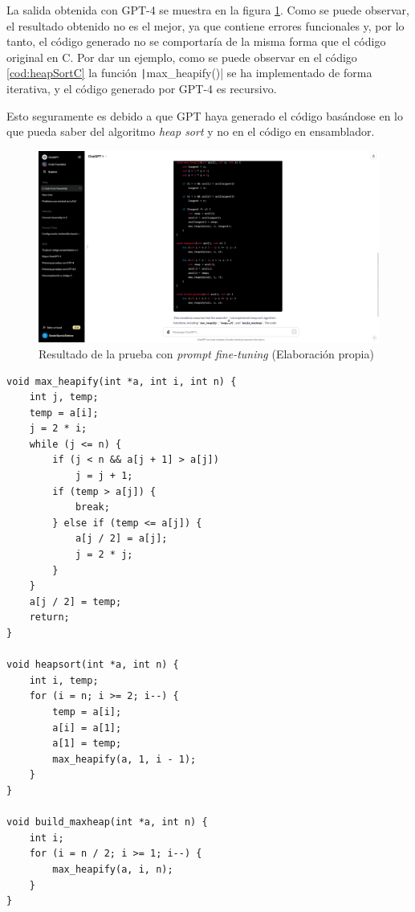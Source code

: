 La salida obtenida con GPT-4 se muestra en la figura \ref{fig:resultado_gpt4_prompt}. Como se puede
observar, el resultado obtenido no es el mejor, ya que contiene errores funcionales y, por lo tanto,
el código generado no se comportaría de la misma forma que el código original en C. Por dar un ejemplo,
como se puede observar en el código \ref{cod:heapSortC} la función \texttt|max_heapify()| se ha
implementado de forma iterativa, y el código generado por GPT-4 es recursivo.

Esto seguramente es debido a que GPT haya generado el código basándose en lo que pueda saber del algoritmo
\textit{heap sort} y no en el código en ensamblador.

\begin{figure}[H]
    \begin{center}
      \includegraphics[scale=0.3]{figuras/Capitulo_05/ResultadoPromptGPT4.png}
    \end{center}
    \caption[Resultado de la prueba con \textit{prompt fine-tuning}]{Resultado de la prueba con \textit{prompt fine-tuning} (Elaboración propia)}
    \label{fig:resultado_gpt4_prompt}
\end{figure}

\begin{mycode}
    \begin{verbatim}
void max_heapify(int *a, int i, int n) {
    int j, temp;
    temp = a[i];
    j = 2 * i;
    while (j <= n) {
        if (j < n && a[j + 1] > a[j])
            j = j + 1;
        if (temp > a[j]) {
            break;
        } else if (temp <= a[j]) {
            a[j / 2] = a[j];
            j = 2 * j;
        }
    }
    a[j / 2] = temp;
    return;
}

void heapsort(int *a, int n) {
    int i, temp;
    for (i = n; i >= 2; i--) {
        temp = a[i];
        a[i] = a[1];
        a[1] = temp;
        max_heapify(a, 1, i - 1);
    }
}

void build_maxheap(int *a, int n) {
    int i;
    for (i = n / 2; i >= 1; i--) {
        max_heapify(a, i, n);
    }
}
    \end{verbatim}
    \caption[Código original en C del algoritmo \textit{heap sort}]{Código original en C del algoritmo \textit{heap sort} (Elaboración propia)}
    \label{cod:heapSortC}
\end{mycode}

